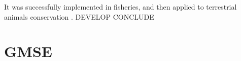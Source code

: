 \documentclass[12pt,a4paper]{article}
\begin{document}
It was successfully implemented in fisheries, and then applied to terrestrial animals conservation \citep{BUNNEFELD2011441, bunnefeld2013incentivizing}.
DEVELOP
CONCLUDE


\section{GMSE}%

\end{document}

